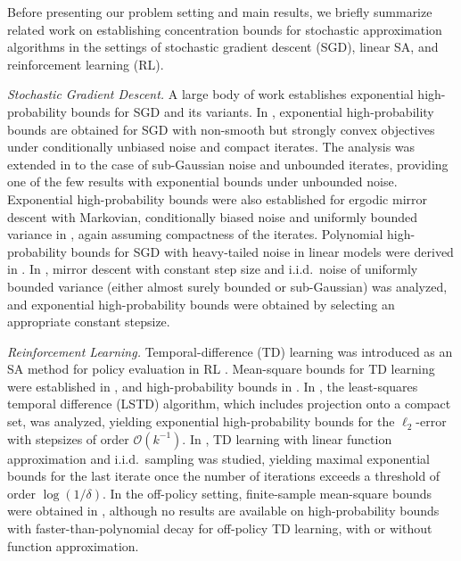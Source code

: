 \documentclass{article}
\begin{document}
Before presenting our problem setting and main results, we briefly summarize related work on establishing concentration bounds for stochastic approximation algorithms in the settings of stochastic gradient descent (SGD), linear SA, and reinforcement learning (RL).

\textit{Stochastic Gradient Descent.}
A large body of work establishes exponential high-probability bounds for SGD and its variants. In \citet{rakhlin2012,Hazan14}, exponential high-probability bounds are obtained for SGD with non-smooth but strongly convex objectives under conditionally unbiased noise and compact iterates. The analysis was extended in \citet{Harvey19} to the case of sub-Gaussian noise and unbounded iterates, providing one of the few results with exponential bounds under unbounded noise. Exponential high-probability bounds were also established for ergodic mirror descent with Markovian, conditionally biased noise and uniformly bounded variance in \citet{duchi2012ergodic}, again assuming compactness of the iterates. Polynomial high-probability bounds for SGD with heavy-tailed noise in linear models were derived in \citet{heavySGD}. In \citet{telgarsky22}, mirror descent with constant step size and i.i.d.\ noise of uniformly bounded variance (either almost surely bounded or sub-Gaussian) was analyzed, and exponential high-probability bounds were obtained by selecting an appropriate constant stepsize.

\textit{Reinforcement Learning.}
Temporal-difference (TD) learning was introduced as an SA method for policy evaluation in RL \citep{sutton1988learning,sutton2018reinforcement}. Mean-square bounds for TD learning were established in \citet{bhandari2018finite,srikant2019finite}, and high-probability bounds in \citet{dalal2018finite,LSTD17,chandak2023concentration}. In \citet{LSTD17}, the least-squares temporal difference (LSTD) algorithm, which includes projection onto a compact set, was analyzed, yielding exponential high-probability bounds for the $\ell_2$-error with stepsizes of order $\mathcal{O}(k^{-1})$. In \citet{dalal2018finite}, TD learning with linear function approximation and i.i.d.\ sampling was studied, yielding maximal exponential bounds for the last iterate once the number of iterations exceeds a threshold of order $\log(1/\delta)$. In the off-policy setting, finite-sample mean-square bounds were obtained in \citet{chen2021GB,chen2022sample}, although no results are available on high-probability bounds with faster-than-polynomial decay for off-policy TD learning, with or without function approximation. 
\end{document}

